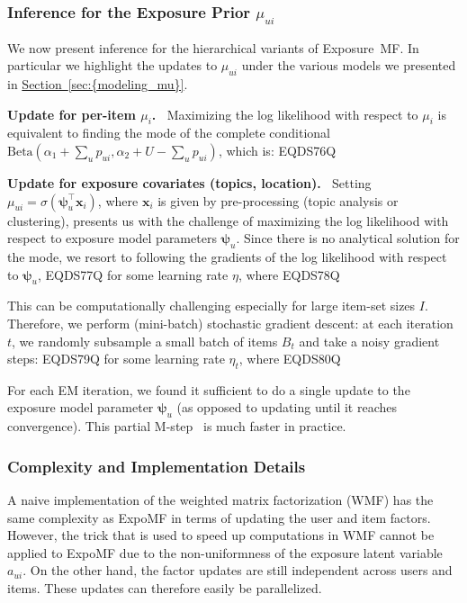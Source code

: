 \documentclass{sig-alternate-arxiv}
\begin{document}
\subsubsection*{Inference for the Exposure Prior $\mu_{ui}$}
\label{sec:inf_hier_model}
We now present inference for the hierarchical variants of Exposure~MF. 
In particular we highlight the updates to 
$\mu_{ui}$ under the various models we presented in {\hyperref[sec:{modeling_mu}]{Section~\ref*{sec:{modeling_mu}}}}.

{\vspace{0.1in}\noindent \textbf{{Update for per-item $\mu_{i}$.} \,}} Maximizing the log likelihood with respect to $\mu_i$ is equivalent to finding the mode of the complete conditional $\text{Beta}(\alpha_1 + \sum_u p_{ui}, \alpha_2 + U - \sum_u p_{ui})$, which is:
EQDS76Q

{\vspace{0.1in}\noindent \textbf{{Update for exposure covariates (topics, location).} \,}} Setting $\mu_{ui} = \sigma(\boldsymbol\psi_u^\top \mathbf{x}_i)$, where $\mathbf{x}_i$ is given by pre-processing (topic analysis or clustering), presents us with the challenge of maximizing the log likelihood with respect to exposure model parameters $\boldsymbol\psi_u$. Since there is no analytical solution for the mode, we resort to following the gradients of the log likelihood with respect to $\boldsymbol\psi_u$,
EQDS77Q
for some learning rate $\eta$, where
EQDS78Q

This can be computationally challenging especially for large item-set sizes $I$. Therefore, we perform (mini-batch) stochastic gradient descent: at each iteration $t$, we randomly subsample a small batch of items $B_t$ and take a noisy gradient steps:
EQDS79Q
for some learning rate $\eta_t$, where
EQDS80Q

For each EM iteration, we found it sufficient to do a single update to the
exposure model parameter $\boldsymbol\psi_u$ (as opposed to updating until it
reaches convergence). This partial M-step~\cite{neal1998view} is much faster in
practice. 

\subsubsection*{Complexity and Implementation Details}

A naive implementation of the weighted matrix factorization (WMF) \cite{hu2008collaborative} has the same complexity as ExpoMF in terms of updating the user and item factors. However, the trick that is used to speed up computations in WMF cannot be applied to ExpoMF due to the non-uniformness of the exposure latent variable $a_{ui}$. On the other hand, the factor updates are still independent across users and items. These updates can therefore easily be parallelized.
\end{document}
